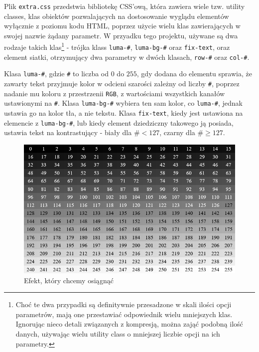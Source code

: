 \documentclass[licencjacka]{pracadypl}
\begin{document}
Plik \texttt{extra.css} przedstwia bibliotekę CSS'ową, która zawiera wiele tzw. utility classes, klas obiektów pozwalających na dostosowanie wyglądu elementów wyłącznie z poziomu kodu HTML, poprzez użycie wielu klas zawierających w swojej nazwie żądany parametr. W przyadku tego projektu, używane są dwa rodzaje takich klas\footnote{Choć te dwa przypadki są definitywnie przesadzone w skali ilości opcji parametrów, mają one przestawiać odpowiednik wielu mniejszych klas. Ignorując nieco detali związanych z kompresją, można zająć podobną ilość danych, używając wielu utility class o mniejszej liczbie opcji na ich parametry.} - trójka klass \texttt{luma-\#}, \texttt{luma-bg-\#} oraz \texttt{fix-text}, oraz element siatki, otrzymujący dwa parametry w dwóch klasach, \texttt{row-\#} oraz \texttt{col-\#}.

Klasa \texttt{luma-\#}, gdzie \texttt{\#} to liczba od $0$ do $255$, gdy dodana do elementu sprawia, że zawarty tekst przyjmuje kolor w odcieni szarości zależny od liczby \texttt{\#}, poprzez nadanie mu koloru z przestrzenii \texttt{RGB}, z wartościami wszystkich kanałów ustawionymi na \texttt{\#}. Klasa \texttt{luma-bg-\#} wybiera ten sam kolor, co \texttt{luma-\#}, jednak ustawia go na kolor tła, a nie tekstu. Klasa \texttt{fix-text}, kiedy jest ustawiona na elemencie z \texttt{luma-bg-\#}, lub kiedy element dziedziczny takowego ją posiada, ustawia tekst na kontrastujący - biały dla $\texttt{\#} < 127$, czarny dla $\texttt{\#} \geq 127$.

\begin{figure}[H]
  \centering
  \includegraphics[width=\linewidth]{images/ui-luma-grid.png}
  \caption{Efekt, który chcemy osiągnąć}
  \label{fig:ui-luma-grid}
\end{figure}
\end{document}
